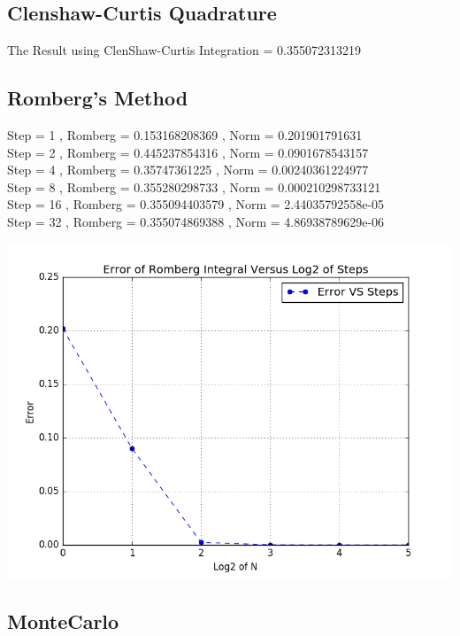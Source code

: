 \documentclass[a4paper]{article}
\begin{document}
\subsection*{Clenshaw-Curtis Quadrature}
The Result using ClenShaw-Curtis Integration = 0.355072313219 \\

\subsection*{Romberg's Method}
Step = 1 , Romberg = 0.153168208369 , Norm = 0.201901791631\\
Step = 2 , Romberg = 0.445237854316 , Norm = 0.0901678543157\\
Step = 4 , Romberg = 0.35747361225 , Norm = 0.00240361224977\\
Step = 8 , Romberg = 0.355280298733 , Norm = 0.000210298733121\\
Step = 16 , Romberg = 0.355094403579 , Norm = 2.44035792558e-05\\
Step = 32 , Romberg = 0.355074869388 , Norm = 4.86938789629e-06 \\


\begin{center}

\includegraphics[width=\textwidth]{r1.png}

\end{center}

\subsection*{MonteCarlo}
\end{document}
